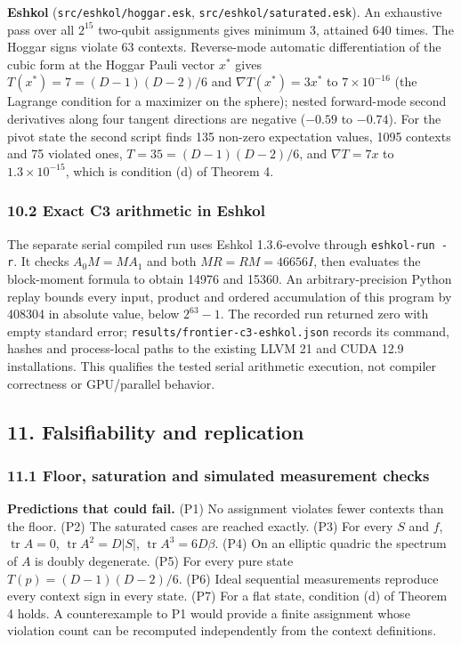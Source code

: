 \documentclass[11pt,a4paper]{article}
\begin{document}
\textbf{Eshkol} (\nolinkurl{src/eshkol/hoggar.esk}, \nolinkurl{src/eshkol/saturated.esk}). An exhaustive pass over all \(2^{15}\)
two-qubit assignments gives minimum 3, attained 640 times. The Hoggar signs violate 63 contexts.
Reverse-mode automatic differentiation of the cubic form at the Hoggar Pauli vector \(x^\ast\) gives
\(T(x^\ast) = 7 = (D-1)(D-2)/6\) and \(\nabla T(x^\ast) = 3x^\ast\) to \(7\times10^{-16}\) (the Lagrange condition
for a maximizer on the sphere); nested forward-mode second derivatives along four tangent directions are
negative (\(-0.59\) to \(-0.74\)). For the pivot state the second script finds 135 non-zero expectation
values, 1095 contexts and 75 violated ones, \(T = 35 = (D-1)(D-2)/6\), and \(\nabla T = 7x\) to
\(1.3\times10^{-15}\), which is condition (d) of Theorem 4.

\subsubsection{10.2 Exact C3 arithmetic in Eshkol}\label{102-exact-c3-arithmetic-in-eshkol}

The separate serial compiled run uses Eshkol 1.3.6-evolve through
\texttt{eshkol-run\ -r}. It checks \(A_0M=MA_1\) and both \(MR=RM=46656I\), then evaluates the block-moment
formula to obtain 14976 and 15360. An arbitrary-precision Python replay bounds every input, product
and ordered accumulation of this program by 408304 in absolute value, below \(2^{63}-1\). The recorded
run returned zero with empty standard error; \nolinkurl{results/frontier-c3-eshkol.json} records its command,
hashes and process-local paths to the existing LLVM 21 and CUDA 12.9 installations. This qualifies
the tested serial arithmetic execution, not compiler correctness or GPU/parallel behavior.

\subsection{11. Falsifiability and replication}\label{11-falsifiability-and-replication}

\subsubsection{11.1 Floor, saturation and simulated measurement checks}\label{111-floor-saturation-and-simulated-measurement-checks}

\textbf{Predictions that could fail.} (P1) No assignment violates fewer contexts than the floor. (P2) The
saturated cases are reached exactly. (P3) For every \(S\) and \(f\), \(\operatorname{tr}A = 0\),
\(\operatorname{tr}A^2 = D|S|\), \(\operatorname{tr}A^3 = 6D\beta\). (P4) On an elliptic quadric the spectrum of
\(A\) is doubly degenerate. (P5) For every pure state \(T(p) = (D-1)(D-2)/6\). (P6) Ideal sequential
measurements reproduce every context sign in every state. (P7) For a flat state, condition (d) of
Theorem 4 holds. A counterexample to P1 would provide a finite assignment whose violation count can
be recomputed independently from the context definitions.
\end{document}

